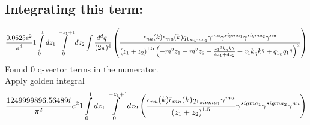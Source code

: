 \subsection*{Integrating this term:}
\begin{dmath}\frac{0.0625 e^{2}}{\pi^{4}}1\int\limits_{ 0 }^{ 1 } d{ z_{ 1 } }\int\limits_{ 0 }^{ - { z_{ 1 } } + 1 } d{ z_{ 2 } }\int\frac{d^d q_1 }{ (2\pi)^4 }\left(\frac{\epsilon_{ \\nu }({ k }) \bar{\epsilon}_{ \\mu }({ k }) { { q_1 }_{ \\sigma_1 } } { \gamma^{ \\mu } } { \gamma^{ \\sigma_1 } } { \gamma^{ \\sigma_2 } } { \gamma^{ \\nu } }}{\left({ z_{ 1 } } + { z_{ 2 } }\right)^{1.5} \left(- m^{2} { z_{ 1 } } - m^{2} { z_{ 2 } } - \frac{{ z_{ 1 } }^{2} { { k }_{ \eta } } { { k }^{ \eta } }}{4 { z_{ 1 } } + 4 { z_{ 2 } }} + { z_{ 1 } } { { k }_{ \eta } } { { k }^{ \eta } } + { { q_1 }_{ \eta } } { { q_1 }^{ \eta } }\right)^{2}}\right)\end{dmath}
Found 0 q-vector terms in the numerator.\\
Apply golden integral
\begin{dmath}\frac{1249999896.56489 i}{\pi^{2}} e^{2}1\int\limits_{ 0 }^{ 1 } d{ z_{ 1 } }\int\limits_{ 0 }^{ - { z_{ 1 } } + 1 } d{ z_{ 2 } }\left(\frac{\epsilon_{ \\nu }({ k }) \bar{\epsilon}_{ \\mu }({ k }) { { q_1 }_{ \\sigma_1 } } { \gamma^{ \\mu } }}{\left({ z_{ 1 } } + { z_{ 2 } }\right)^{1.5}} { \gamma^{ \\sigma_1 } } { \gamma^{ \\sigma_2 } } { \gamma^{ \\nu } }\right)\end{dmath}
